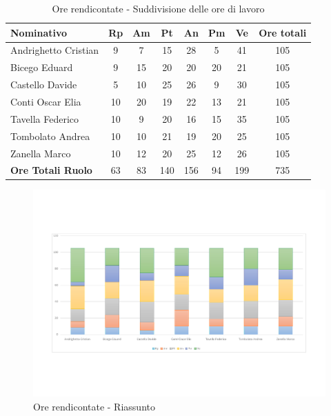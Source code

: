 \documentclass[../PianoProgetto.tex]{subfiles}
\begin{document}
	\begin{table}[H]
		\begin{tabularx}{\textwidth}{l  * {6}{C}  c}
			\toprule
			\textbf{Nominativo} & \textbf{Rp} & \textbf{Am} & \textbf{Pt} 
						& \textbf{An} & \textbf{Pm} & \textbf{Ve} & \textbf{Ore totali} \\
			\midrule
			Andrighetto Cristian & 9 & 7 & 15 & 28 & 5 & 41 &	105 \\
			Bicego Eduard & 9 & 15 & 20 & 20 & 20 & 21 & 105 \\
			Castello Davide & 5 & 10 & 25 & 26 & 9 & 30 & 105 \\
			Conti Oscar Elia & 10 & 20 & 19 & 22 & 13 & 21 & 105 \\
			Tavella Federico &	10 & 9 & 20 & 16 & 15 & 35 & 105 \\
			Tombolato Andrea & 10 & 10 & 21 & 19 & 20 & 25 & 105 \\
			Zanella Marco & 10 & 12 & 20 & 25 & 12 & 26 & 105 \\
			\midrule			
			\textbf{Ore Totali Ruolo} & 63 & 83 & 140 & 156 & 94 & 199 & 735 \\
			\bottomrule
		\end{tabularx}
		\caption{Ore rendicontate - Suddivisione delle ore di lavoro}
		\label{tab:rendicontate_ore}
	\end{table}
	
\newpage
\vfill		
	
	\begin{figure}[H]
		\centering
		\includegraphics[width=\textwidth , trim=2cm 4cm 2cm 4cm]{grafici/Riepilogo/Rendicontate/ore-persona}
			\caption{Ore rendicontate - Riassunto}
		\label{fig:BarChart-rendicontate_ore}
	\end{figure}
	
\end{document}

